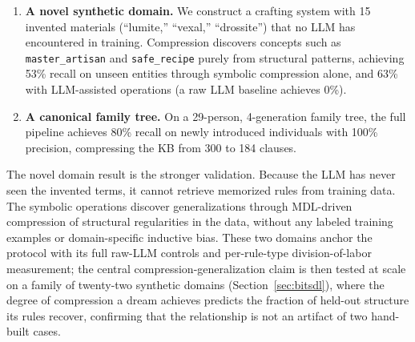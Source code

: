 \documentclass[10pt,conference]{IEEEtran}
\begin{document}
\begin{enumerate}
\item \textbf{A novel synthetic domain.} We construct a crafting system with 15 invented materials (``lumite,'' ``vexal,'' ``drossite'') that no LLM has encountered in training. Compression discovers concepts such as \texttt{master\_artisan} and \texttt{safe\_recipe} purely from structural patterns, achieving 53\% recall on unseen entities through symbolic compression alone, and 63\% with LLM-assisted operations (a raw LLM baseline achieves 0\%).

\item \textbf{A canonical family tree.} On a 29-person, 4-generation family tree, the full pipeline achieves 80\% recall on newly introduced individuals with 100\% precision, compressing the KB from 300 to 184 clauses.
\end{enumerate}

The novel domain result is the stronger validation. Because the LLM has never seen the invented terms, it cannot retrieve memorized rules from training data. The symbolic operations discover generalizations through MDL-driven compression of structural regularities in the data, without any labeled training examples or domain-specific inductive bias. These two domains anchor the protocol with its full raw-LLM controls and per-rule-type division-of-labor measurement; the central compression-generalization claim is then tested at scale on a family of twenty-two synthetic domains (Section~\ref{sec:bitsdl}), where the degree of compression a dream achieves predicts the fraction of held-out structure its rules recover, confirming that the relationship is not an artifact of two hand-built cases.
\end{document}
